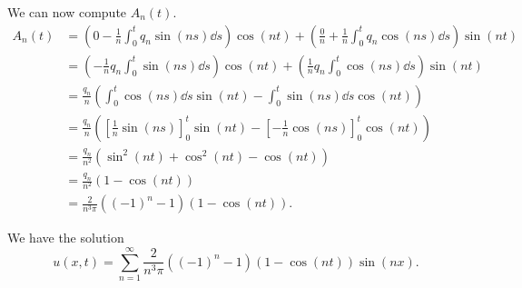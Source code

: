 \documentclass[plain]{pset}
\begin{document}
\begin{solution}
    We can now compute \(A_n(t)\).
    \begin{align*}
        A_n(t) & = \left(0 - \frac{1}{n}\int_0^t q_n \sin(ns) \dd{s}\right)\cos(nt) + \left(\frac{0}{n} + \frac{1}{n}\int_0^t q_n \cos(ns) \dd{s}\right)\sin(nt) \\
               & = \left(-\frac{1}{n}q_n\int_0^t \sin(ns) \dd{s}\right)\cos(nt) + \left(\frac{1}{n}q_n\int_0^t \cos(ns) \dd{s}\right)\sin(nt)                     \\
               & = \frac{q_n}{n}\left(\int_0^t \cos(ns) \dd{s}\sin(nt) - \int_0^t \sin(ns) \dd{s}\cos(nt)\right)                                                    \\
               & = \frac{q_n}{n}\left(\left[\frac{1}{n}\sin(ns)\right]_0^t\sin(nt) - \left[-\frac{1}{n}\cos(ns)\right]_0^t\cos(nt) \right)                        \\
               & = \frac{q_n}{n^2}\left(\sin^2(nt) + \cos^2(nt) - \cos(nt)\right)                                                                                 \\
                & = \frac{q_n}{n^2}\left(1 - \cos(nt)\right)                                                                                                        \\
                & = \frac{2}{n^3\pi}\left((-1)^n - 1\right)\left(1 - \cos(nt)\right).
    \end{align*}

    We have the solution
    \[u(x,t) = \sum_{n=1}^\infty \frac{2}{n^3\pi}\left((-1)^n - 1\right)\left(1 - \cos(nt)\right)\sin(nx).\]
\end{solution}
\end{document}
